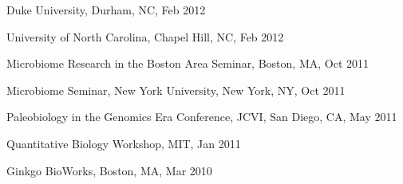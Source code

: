 \documentclass[overlapped,line,11pt]{res}
\newenvironment{list2}{
  \begin{list}{$\bullet$}{%
      \setlength{\itemsep}{0in}
      \setlength{\parsep}{0in} \setlength{\parskip}{0in}
      \setlength{\topsep}{0in} \setlength{\partopsep}{0in} 
      \setlength{\leftmargin}{0.2in}}}{\end{list}}
\begin{document}
\begin{resume}
\begin{revnumerate}[69]
\item {Duke University, Durham, NC, Feb 2012}

\item {University of North Carolina, Chapel Hill, NC, Feb 2012}

\item {Microbiome Research
  in the Boston Area Seminar, Boston, MA, Oct 2011}

\item {Microbiome Seminar,
  New York University, New York, NY, Oct 2011}

\item {Paleobiology in the Genomics Era
  Conference, JCVI, San Diego, CA, May 2011}

\item {Quantitative Biology Workshop, MIT, Jan 2011}

\item {Ginkgo BioWorks, Boston, MA, Mar 2010}

\end{revnumerate}




\end{resume}
\end{document}
